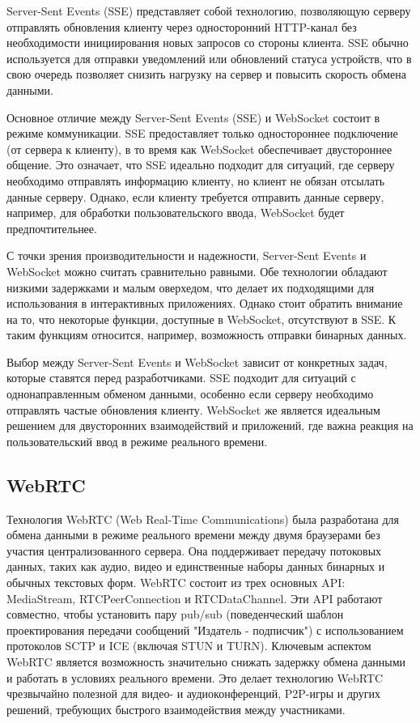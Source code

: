 Server-Sent Events (SSE) представляет собой технологию, позволяющую серверу отправлять обновления клиенту через односторонний HTTP-канал без необходимости инициирования новых запросов со стороны клиента. SSE обычно используется для отправки уведомлений или обновлений статуса устройств, что в свою очередь позволяет снизить нагрузку на сервер и повысить скорость обмена данными.

Основное отличие между Server-Sent Events (SSE) и WebSocket состоит в режиме коммуникации. SSE предоставляет только одностороннее подключение (от сервера к клиенту), в то время как WebSocket обеспечивает двустороннее общение. Это означает, что SSE идеально подходит для ситуаций, где серверу необходимо отправлять информацию клиенту, но клиент не обязан отсылать данные серверу. Однако, если клиенту требуется отправить данные серверу, например, для обработки пользовательского ввода, WebSocket будет предпочтительнее.

С точки зрения производительности и надежности, Server-Sent Events и WebSocket можно считать сравнительно равными. Обе технологии обладают низкими задержками и малым оверхедом, что делает их подходящими для использования в интерактивных приложениях. Однако стоит обратить внимание на то, что некоторые функции, доступные в WebSocket, отсутствуют в SSE. К таким функциям относится, например, возможность отправки бинарных данных.

Выбор между Server-Sent Events и WebSocket зависит от конкретных задач, которые ставятся перед разработчиками. SSE подходит для ситуаций с однонаправленным обменом данными, особенно если серверу необходимо отправлять частые обновления клиенту. WebSocket же является идеальным решением для двусторонних взаимодействий и приложений, где важна реакция на пользовательский ввод в режиме реального времени.

\subsection{WebRTC}

Технология WebRTC (Web Real-Time Communications) была разработана для обмена данными в режиме реального времени между двумя браузерами без участия централизованного сервера. Она поддерживает передачу потоковых данных, таких как аудио, видео и единственные наборы данных бинарных и обычных текстовых форм. WebRTC состоит из трех основных API: MediaStream, RTCPeerConnection и RTCDataChannel. Эти API работают совместно, чтобы установить пару pub/sub (поведенческий шаблон проектирования передачи сообщений "Издатель - подписчик") с использованием протоколов SCTP и ICE (включая STUN и TURN). Ключевым аспектом WebRTC является возможность значительно снижать задержку обмена данными и работать в условиях реального времени. Это делает технологию WebRTC чрезвычайно полезной для видео- и аудиоконференций, P2P-игры и других решений, требующих быстрого взаимодействия между участниками.

